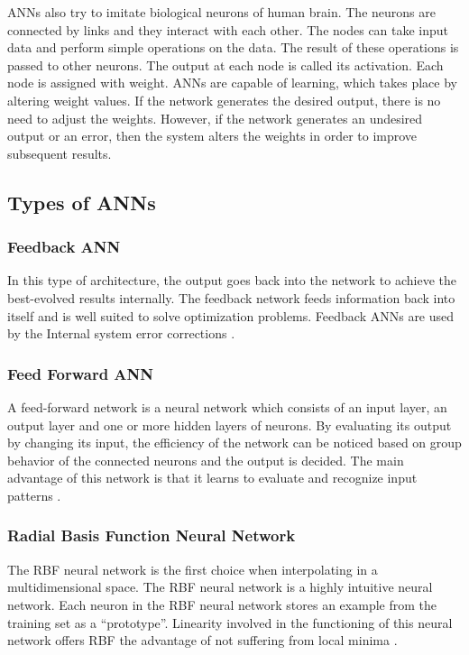 ANNs also try to imitate biological neurons of human brain. The neurons are connected by links and they interact with each other. The nodes can take input data and perform simple operations on the data. The result of these operations is passed to other neurons. The output at each node is called its activation. Each node is assigned with weight. ANNs are capable of learning, which takes place by altering weight values. If the network generates the desired output, there is no need to adjust the weights. However, if the network generates an undesired output or an error, then the system alters the weights in order to improve subsequent results.

\subsection{Types of ANNs}

\subsubsection{Feedback ANN}

In this type of architecture, the output goes back into the network to achieve the best-evolved results internally. The feedback network feeds information back into itself and is well suited to solve optimization problems. Feedback ANNs are used by the Internal system error corrections \cite{Neuralnet}. 

\subsubsection{Feed Forward ANN}

A feed-forward network is a neural network which consists of an input layer, an output layer and one or more hidden layers of neurons. By evaluating its output by changing its input, the efficiency of the network can be noticed based on group behavior of the connected neurons and the output is decided. The main advantage of this network is that it learns to evaluate and recognize input patterns  \cite{Neuralnet}.

\subsubsection{Radial Basis Function Neural Network}

The RBF neural network is the first choice when interpolating in a multidimensional space. The RBF neural network is a highly intuitive neural network. Each neuron in the RBF neural network stores an example from the training set as a ``prototype''. Linearity involved in the functioning of this neural network offers RBF the advantage of not suffering from local minima \cite{Neuralnet}.

